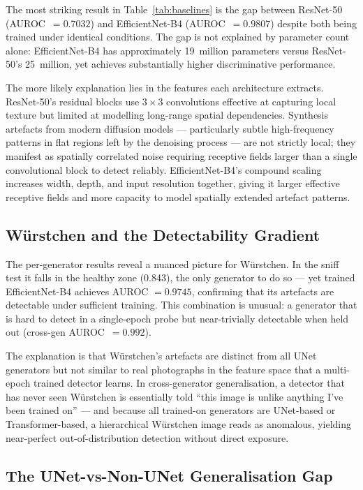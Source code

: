 The most striking result in Table~\ref{tab:baselines} is the gap
between ResNet-50 (AUROC~$= 0.7032$) and EfficientNet-B4
(AUROC~$= 0.9807$) despite both being trained under identical
conditions.
The gap is not explained by parameter count alone: EfficientNet-B4
has approximately 19~million parameters versus ResNet-50's 25~million,
yet achieves substantially higher discriminative performance.

The more likely explanation lies in the features each architecture
extracts.
ResNet-50's residual blocks use $3 \times 3$ convolutions effective
at capturing local texture but limited at modelling long-range spatial
dependencies.
Synthesis artefacts from modern diffusion models --- particularly
subtle high-frequency patterns in flat regions left by the denoising
process --- are not strictly local; they manifest as spatially
correlated noise requiring receptive fields larger than a single
convolutional block to detect reliably.
EfficientNet-B4's compound scaling increases width, depth, and input
resolution together, giving it larger effective receptive fields and
more capacity to model spatially extended artefact patterns.

\subsection{W\"{u}rstchen and the Detectability Gradient}
\label{ssec:disc_wuerstchen}

The per-generator results reveal a nuanced picture for W\"{u}rstchen.
In the sniff test it falls in the healthy zone (0.843), the only
generator to do so --- yet trained EfficientNet-B4 achieves AUROC
$= 0.9745$, confirming that its artefacts are detectable under
sufficient training.
This combination is unusual: a generator that is hard to detect
in a single-epoch probe but near-trivially detectable when held out
(cross-gen AUROC~$= 0.992$).

The explanation is that Würstchen's artefacts are distinct from all
UNet generators but not similar to real photographs in the feature
space that a multi-epoch trained detector learns.
In cross-generator generalisation, a detector that has never seen
W\"{u}rstchen is essentially told ``this image is unlike anything
I've been trained on'' --- and because all trained-on generators
are UNet-based or Transformer-based, a hierarchical Würstchen image
reads as anomalous, yielding near-perfect out-of-distribution
detection without direct exposure.

\subsection{The UNet-vs-Non-UNet Generalisation Gap}
\label{ssec:disc_crossgen}

